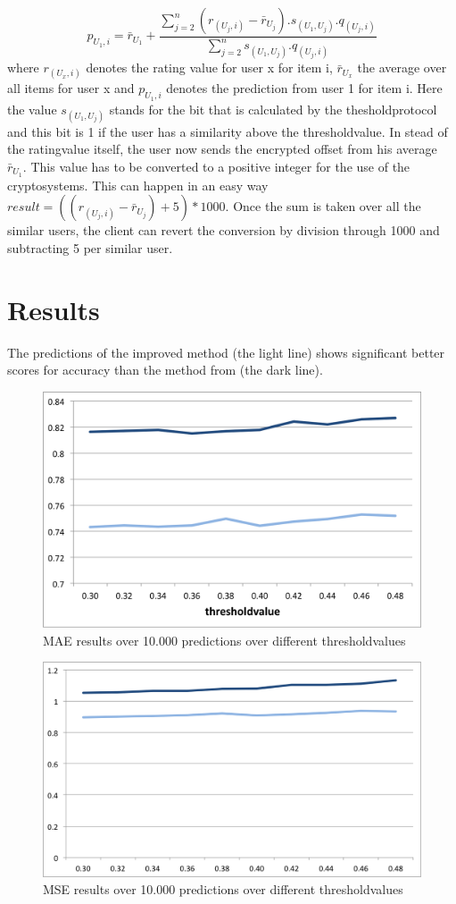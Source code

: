 \documentclass[twocolumn]{phdsymp} %
\begin{document}
\begin{equation}\label{stdrecom}p_{U_1,i} = \bar{r}_{U_1} + \frac{\sum_{j=2}^{n}(r_{(U_j,i)} - \bar{r}_{U_j}).s_{(U_1,U_j)}.q_{(U_j,i)}}{\sum_{j=2}^{n} s_{(U_1,U_j)}.q_{(U_j,i)} }
\end{equation}
where $r_{(U_x,i)}$ denotes the rating value for user x for item i, $\bar{r}_{U_x}$ the average over all items for user x and $p_{U_1,i}$ denotes the prediction from user 1 for item i.
Here the value $s_{(U_1,U_j)}$ stands for the bit that is calculated by the thesholdprotocol and this bit is 1 if the user has a similarity above the thresholdvalue. In stead of the ratingvalue itself, the user now sends the encrypted offset from his average $\bar{r}_{U_1}$. This value has to be converted to a positive integer for the use of the cryptosystems. This can happen in an easy way $result = ((r_{(U_j,i)} - \bar{r}_{U_j})+5)*1000$. Once the sum is taken over all the similar users, the client can revert the conversion by division through 1000 and subtracting 5 per similar user.

\section{Results}
The predictions of the improved method (the light line)  shows significant better scores for accuracy than the method from \cite{dyn} (the dark line). 

\begin{figure}[ht]
\begin{center}
	\includegraphics[width=.40\textwidth]{mae}
	\caption{MAE results over 10.000 predictions over different thresholdvalues}
\end{center}
\end{figure}
\begin{figure}[ht]
\begin{center}
	\includegraphics[width=.40\textwidth]{mse}
	\caption{MSE results over 10.000 predictions over different thresholdvalues}
\end{center}
\end{figure}
\end{document}
